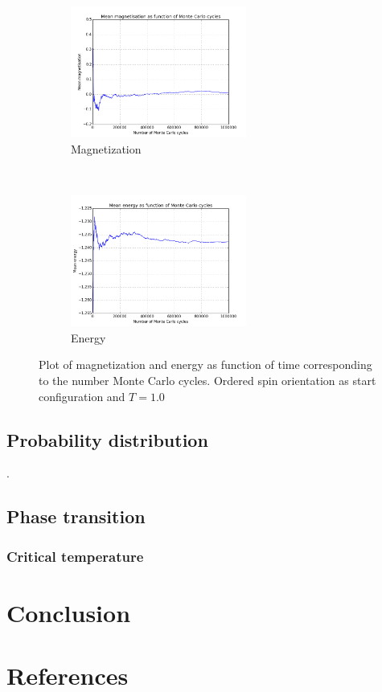 \documentclass{article}
\begin{document}
\begin{figure}[t!]
    \centering
    \begin{subfigure}[t]{0.6\textwidth}
        \centering
        \includegraphics[height=1.7in]{4cmagnetisation24.png}
        \caption{Magnetization}
    \end{subfigure}%
    ~ 
    \begin{subfigure}[t]{0.6\textwidth}
        \centering
        \includegraphics[height=1.7in]{4cenergy24.png}
        \caption{Energy}
    \end{subfigure}
    \caption{Plot of magnetization and energy as function of time corresponding to the number Monte Carlo cycles. Ordered spin orientation as start configuration and $T = 1.0$}
\end{figure}

 

\subsection*{Probability distribution}.
\subsection*{Phase transition}
\subsubsection*{Critical temperature}
\section*{Conclusion}
\section*{References}
\end{document}
